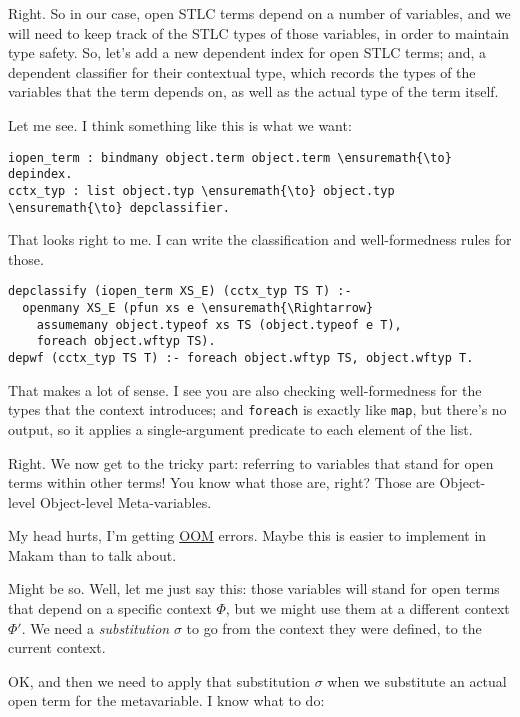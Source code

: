\heroADVISOR{} Right. So in our case, open STLC terms depend on a number of
variables, and we will need to keep track of the STLC types of those
variables, in order to maintain type safety. So, let's add a new
dependent index for open STLC terms; and, a dependent classifier for
their contextual type, which records the types of the variables that the
term depends on, as well as the actual type of the term itself.

\heroSTUDENT{} Let me see. I think something like this is what we want:

\begin{verbatim}
iopen_term : bindmany object.term object.term \ensuremath{\to} depindex.
cctx_typ : list object.typ \ensuremath{\to} object.typ \ensuremath{\to} depclassifier.
\end{verbatim}

\heroADVISOR{} That looks right to me. I can write the classification and
well-formedness rules for those.

\begin{verbatim}
depclassify (iopen_term XS_E) (cctx_typ TS T) :-
  openmany XS_E (pfun xs e \ensuremath{\Rightarrow}
    assumemany object.typeof xs TS (object.typeof e T),
    foreach object.wftyp TS).
depwf (cctx_typ TS T) :- foreach object.wftyp TS, object.wftyp T.
\end{verbatim}

\heroSTUDENT{} That makes a lot of sense. I see you are also checking
well-formedness for the types that the context introduces; and
\texttt{foreach} is exactly like \texttt{map}, but there's no output, so
it applies a single-argument predicate to each element of the list.

\heroADVISOR{} Right. We now get to the tricky part: referring to variables
that stand for open terms within other terms! You know what those are,
right? Those are Object-level Object-level Meta-variables.

\heroSTUDENT{} My head hurts, I'm getting
\href{https://en.wikipedia.org/wiki/Out_of_memory}{OOM} errors. Maybe
this is easier to implement in Makam than to talk about.

\heroADVISOR{} Might be so. Well, let me just say this: those variables will
stand for open terms that depend on a specific context \(\Phi\), but we
might use them at a different context \(\Phi'\). We need a
\emph{substitution} \(\sigma\) to go from the context they were defined,
to the current context.

\heroSTUDENT{} OK, and then we need to apply that substitution \(\sigma\) when
we substitute an actual open term for the metavariable. I know what to
do:

